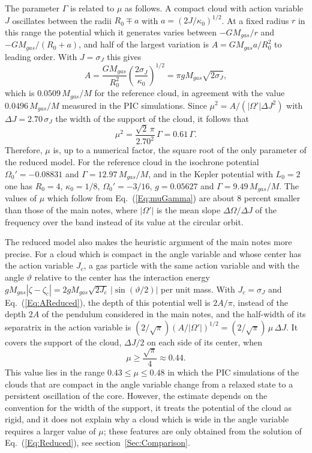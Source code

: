 \documentclass[prd,aps,nofootinbib,superscriptaddress,amsmath,amssymb]{revtex4}
\begin{document}
The parameter $\Gamma$ is related to $\mu$ as follows. A compact cloud with action variable $J$ oscillates between the radii $R_0\mp a$ with $a = (2J/\kappa_0)^{1/2}$. At a fixed radius $r$ in this range the potential which it generates varies between $-GM_{gas}/r$ and $-GM_{gas}/(R_0 + a)$, and half of the largest variation is $A = GM_{gas}a/R_0^2$ to leading order. With $J = \sigma_J$ this gives
\begin{equation}
A = \frac{GM_{gas}}{R_0^2}\left( \frac{2\sigma_J}{\kappa_0} \right)^{1/2} = \pi g M_{gas}\sqrt{2\sigma_J},
\label{Eq:AReduced}
\end{equation}
which is $0.0509\, M_{gas}/M$ for the reference cloud, in agreement with the value $0.0496\, M_{gas}/M$ measured in the PIC simulations. Since $\mu^2 = A/(|\Omega'|\Delta J^2)$ with $\Delta J = 2.70\,\sigma_J$ the width of the support of the cloud, it follows that
\begin{equation}
\mu^2 = \frac{\sqrt{2}\,\pi}{2.70^2}\,\Gamma = 0.61\,\Gamma.
\label{Eq:muGamma}
\end{equation}
Therefore, $\mu$ is, up to a numerical factor, the square root of the only parameter of the reduced model. For the reference cloud in the isochrone potential $\Omega_0' = -0.08831$ and $\Gamma = 12.97\, M_{gas}/M$, and in the Kepler potential with $L_0 = 2$ one has $R_0 = 4$, $\kappa_0 = 1/8$, $\Omega_0' = -3/16$, $g = 0.05627$ and $\Gamma = 9.49\, M_{gas}/M$. The values of $\mu$ which follow from Eq.~(\ref{Eq:muGamma}) are about $8$ percent smaller than those of the main notes, where $|\Omega'|$ is the mean slope $\Delta\Omega/\Delta J$ of the frequency over the band instead of its value at the circular orbit.

The reduced model also makes the heuristic argument of the main notes more precise. For a cloud which is compact in the angle variable and whose center has the action variable $J_c$, a gas particle with the same action variable and with the angle $\vartheta$ relative to the center has the interaction energy $g M_{gas}|\zeta - \zeta_c| = 2gM_{gas}\sqrt{2J_c}\,|\sin(\vartheta/2)|$ per unit mass. With $J_c = \sigma_J$ and Eq.~(\ref{Eq:AReduced}), the depth of this potential well is $2A/\pi$, instead of the depth $2A$ of the pendulum considered in the main notes, and the half-width of its separatrix in the action variable is $(2/\sqrt{\pi})(A/|\Omega'|)^{1/2} = (2/\sqrt{\pi})\,\mu\,\Delta J$. It covers the support of the cloud, $\Delta J/2$ on each side of its center, when
\begin{equation}
\mu\geq \frac{\sqrt{\pi}}{4}\approx 0.44.
\label{Eq:muEstimate}
\end{equation}
This value lies in the range $0.43\leq\mu\leq 0.48$ in which the PIC simulations of the clouds that are compact in the angle variable change from a relaxed state to a persistent oscillation of the core. However, the estimate depends on the convention for the width of the support, it treats the potential of the cloud as rigid, and it does not explain why a cloud which is wide in the angle variable requires a larger value of $\mu$; these features are only obtained from the solution of Eq.~(\ref{Eq:Reduced}), see section~\ref{Sec:Comparison}.
\end{document}
